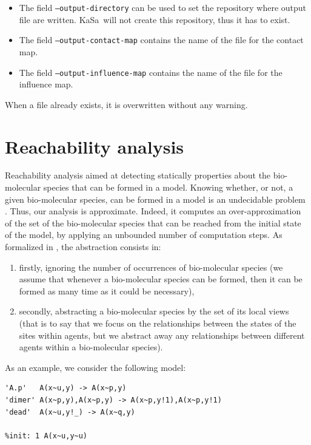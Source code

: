 \documentclass[11pt]{book}
\def\KaSa{\textsf{KaSa}}
\begin{document}
\begin{itemize}
\item The field \texttt{--output-directory} can be used to set the repository where output file are written. \KaSa~will not create this repository, thus it has to exist. 
\item The field \texttt{--output-contact-map} contains the name of the file for the contact map. 
\item The field \texttt{--output-influence-map} contains the name of the file for the influence map. 
\end{itemize}

When a file already exists, it is overwritten without any warning. 

\section{Reachability analysis}

Reachability analysis aimed at detecting statically properties about the bio-molecular species that can be formed in a model. 
Knowing whether, or not, a given bio-molecular species, can be formed in a model is an undecidable problem \cite{Kreyssig}. Thus, our analysis is approximate. Indeed, it computes an over-approximation of the set of the bio-molecular species that can be reached from the initial state of the model, by applying an unbounded number of computation steps. As formalized in \cite{DanosEtAl-VMCAI08}, the abstraction consists in:
\begin{enumerate}
\item firstly, ignoring the number of occurrences of bio-molecular species (we assume that whenever a bio-molecular species can be formed, then it can be formed as many time as it could be necessary), 
\item secondly, abstracting a bio-molecular species by the set of its local views (that is to say that we focus on the relationships between the states of the sites within agents, but we abstract away any relationships between different agents within a bio-molecular species).
\end{enumerate}

As an example, we consider the following model:
\begin{lstlisting}[language=kappa]
'A.p'   A(x~u,y) -> A(x~p,y)
'dimer' A(x~p,y),A(x~p,y) -> A(x~p,y!1),A(x~p,y!1)
'dead'  A(x~u,y!_) -> A(x~q,y)

%init: 1 A(x~u,y~u)
\end{lstlisting}
\end{document}
